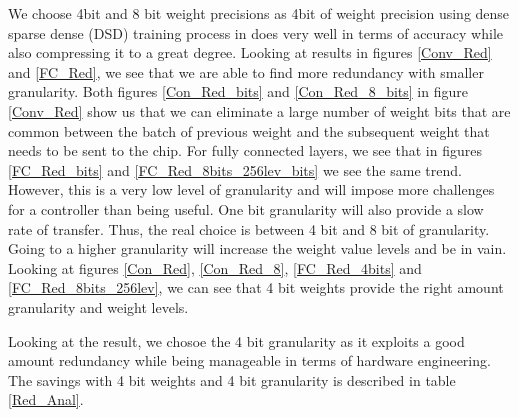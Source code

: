 \documentclass[conference]{IEEEtran}
\begin{document}
We choose 4bit and 8 bit weight precisions as 4bit of weight precision using dense sparse dense (DSD) training process in \cite{han2016dsd} does very well in terms of accuracy while also compressing it to a great degree. Looking at results in figures \ref{Conv_Red} and \ref{FC_Red}, we see that 
we are able to find more redundancy with smaller granularity. Both figures \ref{Con_Red_bits} and \ref{Con_Red_8_bits} in figure \ref{Conv_Red} show us that we can eliminate a large number of weight bits that are common between the batch of previous weight and the subsequent weight that needs to be sent to the chip. For fully connected layers, we see that in figures \ref{FC_Red_bits} and  \ref{FC_Red_8bits_256lev_bits} we see the same trend. However, this is a very low level of granularity and will impose more challenges for a controller than being useful. One bit granularity will also provide a slow rate of transfer. Thus, the real choice is between 4 bit and 8 bit of granularity. Going to a higher granularity will increase the weight value levels and be in vain. Looking at figures \ref{Con_Red}, \ref{Con_Red_8}, \ref{FC_Red_4bits} and \ref{FC_Red_8bits_256lev}, we can see that 4 bit weights provide the right amount granularity and weight levels. 

Looking at the result, we chosoe the 4 bit granularity as it exploits a good amount redundancy while being manageable in terms of hardware engineering. The savings with 4 bit weights and 4 bit granularity is described in table \ref{Red_Anal}.
\end{document}
